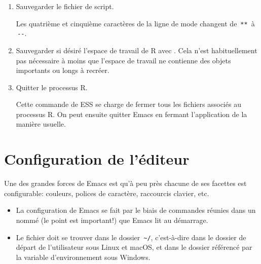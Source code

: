 \begin{enumerate}
\begin{trivlist}
    \hfill
  \end{trivlist}
\item Sauvegarder le fichier de script.
  Les quatrième et cinquième caractères de la ligne de mode changent
  de \,\verb|**|\, à \,\verb|--|.
\item Sauvegarder si désiré l'espace de travail de R avec
  . Cela n'est
  habituellement pas nécessaire à moins que l'espace de travail ne
  contienne des objets importants ou longs à recréer.
\item Quitter le processus R.
  Cette commande de ESS se charge de fermer tous les fichiers associés
  au processus R. On peut ensuite quitter Emacs en fermant
  l'application de la manière usuelle.
\end{enumerate}



\section{Configuration de l'éditeur}
\label{sec:emacs+ess:configuration}

Une des grandes forces de Emacs est qu'à peu près chacune de ses
facettes est configurable: couleurs, polices de caractère, raccourcis
clavier, etc.

\begin{itemize}
\item La configuration de Emacs se fait par le biais de commandes
  réunies dans un %
  nommé  (le point est important!) que Emacs lit au
  démarrage.
\item Le fichier  doit se trouver dans le dossier
  \,\verb=~/=, c'est-à-dire dans le dossier de départ de l'utilisateur
  sous Linux et macOS, et dans le dossier référencé par la variable
  d'environnement  sous Windows.
\end{itemize}


